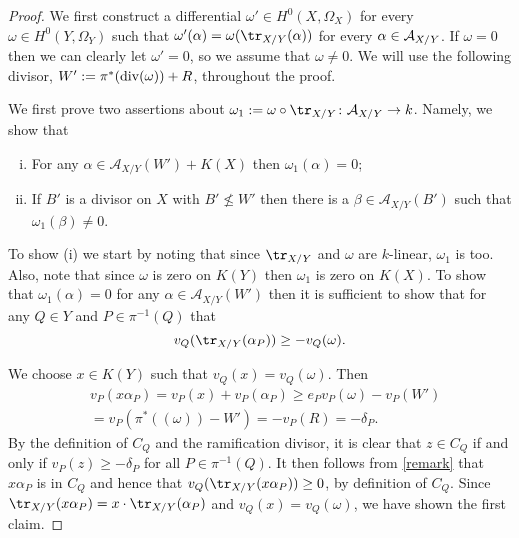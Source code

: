     \begin{proof}
    We first construct a differential $\omega'\in H^0(X,\Omega_X)$ for every $\omega\in H^0(Y,\Omega_Y)$ such that $\omega'(\alpha) = \omega(\tr_{X/Y}(\alpha))$ for every $\alpha \in {\mathcal A}_{X/Y}$.
    If $\omega = 0$ then we can clearly let $\omega' = 0$, so we assume that $\omega \neq 0$.
    We will use the following divisor, $W' := \pi^*(\operatorname{div} (\omega)) + R$, throughout the proof.
    
    We first prove two assertions about $\omega_1:= \omega\circ \tr_{X/Y} \colon \mathcal{A}_{X/Y} \rightarrow k$.
    Namely, we show that
        \begin{enumerate}[(i)]
        \item For any $\alpha \in \mathcal{A}_{X/Y}(W') + K(X)$ then $\omega_1(\alpha) = 0$;
        \item If $B'$ is a divisor on $X$ with $B' \nleq W'$ then there is a $\beta \in \mathcal{A}_{X/Y}(B')$ such that $\omega_1(\beta) \neq 0$.
        \end{enumerate}
    To show (i) we start by noting that since $\tr_{X/Y}$ and $\omega$ are $k$-linear, $\omega_1$ is too.
    Also, note that since $\omega$ is zero on $K(Y)$ then $\omega_1$ is zero on $K(X)$.
    To show that $\omega_1(\alpha) = 0$ for any $\alpha \in \mathcal{A}_{X/Y}(W')$ then it is sufficient to show that for any $Q\in Y$ and $P\in \pi^{-1}(Q)$ that
        \[
        v_Q(\tr_{X/Y}(\alpha_P)) \geq -v_Q(\omega).
        \]
    
    We choose $x\in K(Y)$ such that $v_Q(x) = v_Q(\omega)$.
    Then
        \begin{align}\label{remark}
        & v_P(x \alpha_P) = v_P(x) + v_P(\alpha_P) \geq e_P v_P(\omega) - v_P(W') \nonumber \\
        & = v_P(\pi^*((\omega)) - W') = -v_P(R) = -\delta_P. 
        \end{align}
    By the definition of $C_Q$ and the ramification divisor, it is clear that $z\in C_Q$ if and only if $v_P(z)\geq -\delta_P$ for all $P\in \pi^{-1}(Q)$.
    It then follows from \eqref{remark} that $x \alpha_P$ is in $C_Q$ and hence that $v_Q(\tr_{X/Y}(x \alpha_P)) \geq 0$, by definition of $C_Q$.
    Since $\tr_{X/Y}(x \alpha_P) = x\cdot \tr_{X/Y}(\alpha_P)$ and $v_Q(x) = v_Q(\omega)$, we have shown the first claim.
    

\end{proof}
